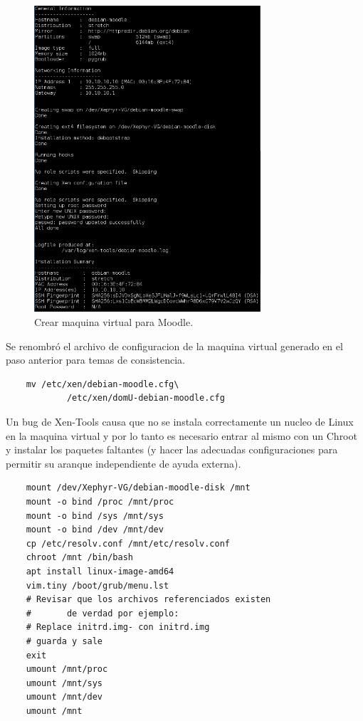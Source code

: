 \begin{figure}
	\begin{center}
    	\includegraphics[width=0.75\textwidth]{Figures/crear-moodle.png}
    \end{center}
  	\caption{Crear maquina virtual para Moodle.}
    \label{vm-moodle}
\end{figure}

Se renombró el archivo de configuracion de la maquina virtual generado en el paso anterior para temas de consistencia.

\begin{lstlisting}
	mv /etc/xen/debian-moodle.cfg\
    		/etc/xen/domU-debian-moodle.cfg
\end{lstlisting}

Un bug de Xen-Tools causa que no se instala correctamente un nucleo de Linux en la maquina virtual y por lo tanto es necesario entrar al mismo con un Chroot y instalar los paquetes faltantes (y hacer las adecuadas configuraciones  para permitir su aranque independiente de ayuda externa).

\begin{lstlisting}
	mount /dev/Xephyr-VG/debian-moodle-disk /mnt
	mount -o bind /proc /mnt/proc
	mount -o bind /sys /mnt/sys
	mount -o bind /dev /mnt/dev
	cp /etc/resolv.conf /mnt/etc/resolv.conf
	chroot /mnt /bin/bash
	apt install linux-image-amd64
	vim.tiny /boot/grub/menu.lst
	# Revisar que los archivos referenciados existen
	#		de verdad por ejemplo:
	# Replace initrd.img- con initrd.img
    # guarda y sale
	exit
	umount /mnt/proc            
	umount /mnt/sys 
	umount /mnt/dev 
	umount /mnt	
\end{lstlisting}


